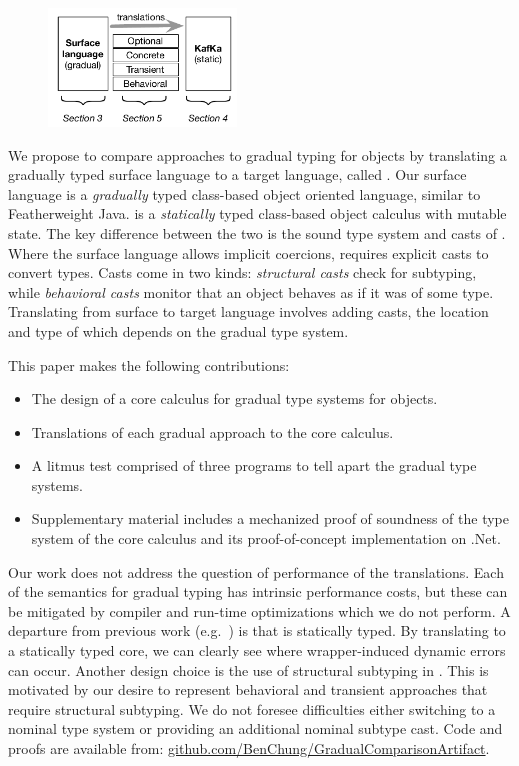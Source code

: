 \documentclass[USenglish]{tex/lipics-v2016}
\begin{document}
\begin{figure}
\vspace{-4mm}
\includegraphics[width=5cm]{fig1}
\vspace{-8mm}\end{figure}

We propose to compare approaches to gradual typing for objects by
translating a gradually typed surface language to a target language, called
\kafka. Our surface language is a \emph{gradually} typed class-based object
oriented language, similar to Featherweight Java. \kafka is a
\emph{statically} typed class-based object calculus with mutable state. The
key difference between the two is the sound type system and casts of \kafka.
Where the surface language allows implicit coercions, \kafka requires
explicit casts to convert types. Casts come in two kinds: \emph{structural
  casts} check for subtyping, while \emph{behavioral casts} monitor that an
object behaves as if it was of some type. Translating from surface to target
language involves adding casts, the location and type of which depends on
the gradual type system.

This paper makes the following contributions:
\begin{itemize}  
  \item The design of a core calculus for gradual type systems for objects.
\item Translations of each gradual approach to the core calculus.
\item A litmus test comprised of three programs to tell apart the gradual
  type systems.
\item Supplementary material includes a mechanized proof of soundness of the
  type system of the core calculus and its proof-of-concept implementation
  on  .Net.
\end{itemize}

\noindent Our work does not address the question of performance of the
translations. Each of the semantics for gradual typing has intrinsic
performance costs, but these can be mitigated by compiler and run-time
optimizations which we do not perform. A departure from previous work
(e.g.~\cite{greenman18}) is that \kafka is statically typed.  By translating
to a statically typed core, we can clearly see where wrapper-induced dynamic
errors can occur. Another design choice is the use of structural subtyping
in \kafka. This is motivated by our desire to represent behavioral and
transient approaches that require structural subtyping. We do not foresee
difficulties either switching to a nominal type system or providing an
additional nominal subtype cast. Code and proofs are available from: {\small
  \url{github.com/BenChung/GradualComparisonArtifact}.}
\end{document}
